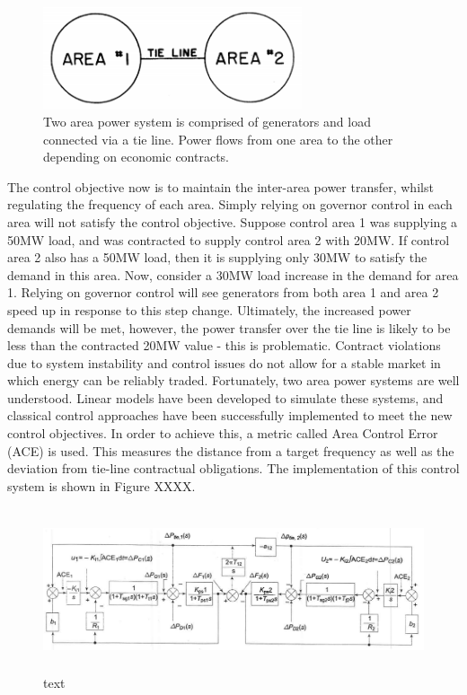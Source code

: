 \documentclass[12pt, a4paper]{article}
\begin{document}
\begin{figure}[h]
	\centering
	\includegraphics[height=3cm]{two_area_system}
	\caption{Two area power system is comprised of generators and load connected via a tie line. Power flows from one area to the other depending on economic contracts.}
\end{figure}

The control objective now is to maintain the inter-area power transfer, whilst regulating the frequency of each area. Simply relying on governor control in each area will not satisfy the control objective. Suppose control area 1 was supplying a 50MW load, and was contracted to supply control area 2 with 20MW. If control area 2 also has a 50MW load, then it is supplying only 30MW to satisfy the demand in this area. Now, consider a 30MW load increase in the demand for area 1. Relying on governor control will see generators from both area 1 and area 2 speed up in response to this step change. Ultimately, the increased power demands will be met, however, the power transfer over the tie line is likely to be less than the contracted 20MW value - this is problematic. Contract violations due to system instability and control issues do not allow for a stable market in which energy can be reliably traded. Fortunately, two area power systems are well understood. Linear models have been developed to simulate these systems, and classical control approaches have been successfully implemented to meet the new control objectives. In order to achieve this, a metric called Area Control Error (ACE) is used. This measures the distance from a target frequency as well as the deviation from tie-line contractual obligations. The implementation of this control system is shown in Figure XXXX.

\begin{figure}[h]
	\centering
	\includegraphics[height=4.8cm]{two_area_control_block}
	\caption{text}
\end{figure}
\end{document}
